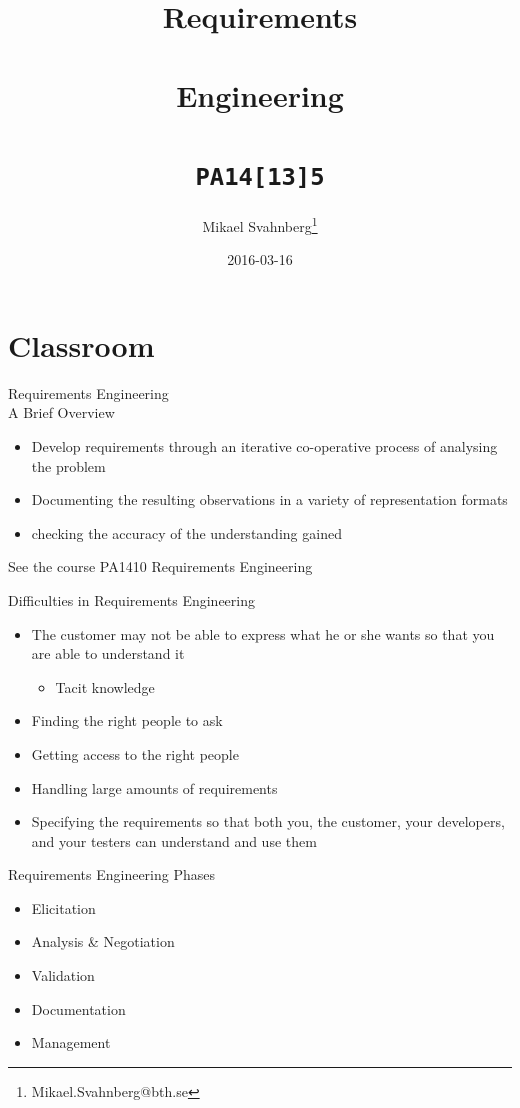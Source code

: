 \documentclass[10pt,t,a4paper]{beamer}
\author{Mikael Svahnberg\thanks{Mikael.Svahnberg@bth.se}}
\date{2016-03-16}
\title{Requirements \\\\ Engineering \\\\ \texttt{PA14[13]5}}
\begin{document}
\maketitle

\section{Classroom}
\label{sec-1}
\begin{frame}[label=sec-1-1]{Requirements Engineering \\ A Brief Overview}
\begin{itemize}
\item Develop requirements through an iterative co-operative process of analysing the problem
\item Documenting the resulting observations in a variety of representation formats
\item checking the accuracy of the understanding gained
\end{itemize}

See the course PA1410 Requirements Engineering
\end{frame}
\begin{frame}[label=sec-1-2]{Difficulties in Requirements Engineering}
\begin{itemize}
\item The customer may not be able to express what he or she wants so that you are able to understand it
\begin{itemize}
\item Tacit knowledge
\end{itemize}
\item Finding the right people to ask
\item Getting access to the right people
\item Handling large amounts of requirements
\item Specifying the requirements so that both you, the customer, your developers, and your testers can understand and use them
\end{itemize}
\end{frame}
\begin{frame}[label=sec-1-3]{Requirements Engineering Phases}
\begin{itemize}
\item Elicitation
\item Analysis \& Negotiation
\item Validation
\item Documentation
\item Management
\end{itemize}
\end{frame}
\end{document}
